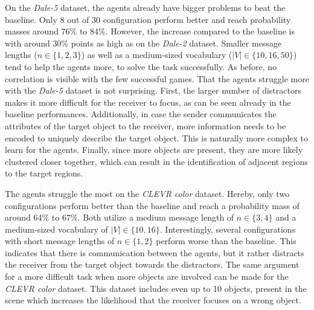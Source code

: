On the \emph{Dale-5} dataset, the agents already have bigger problems to beat the baseline.
Only 8 out of 30 configuration perform better and reach probability masses around 76\% to 84\%.
However, the increase compared to the baseline is with around 30\% points as high as on the \emph{Dale-2} dataset.
Smaller message lengths ($n \in \{1,2,3\}$) as well as a medium-sized vocabulary ($|V| \in \{10,16,50\}$) tend to help the agents more, to solve the task successfully.
As before, no correlation is visible with the few successful games.
That the agents struggle more with the \emph{Dale-5} dataset is not surprising.
First, the larger number of distractors makes it more difficult for the receiver to focus, as can be seen already in the baseline performances.
Additionally, in case the sender communicates the attributes of the target object to the receiver, more information needs to be encoded to uniquely describe the target object.
This is naturally more complex to learn for the agents.
Finally, since more objects are present, they are more likely clustered closer together, which can result in the identification of adjacent regions to the target regions.

The agents struggle the most on the \emph{CLEVR color} dataset.
Hereby, only two configurations perform better than the baseline and reach a probability mass of around 64\% to 67\%.
Both utilize a medium message length of $n \in \{3,4\}$ and a medium-sized vocabulary of $|V| \in \{10,16\}$.
Interestingly, several configurations with short message lengths of $n \in \{1,2\}$ perform worse than the baseline.
This indicates that there is communication between the agents, but it rather distracts the receiver from the target object towards the distractors.
The same argument for a more difficult task when more objects are involved can be made for the \emph{CLEVR color} dataset.
This dataset includes even up to 10 objects, present in the scene which increases the likelihood that the receiver focuses on a wrong object.

